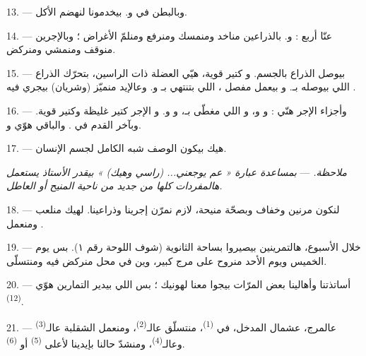 13. --- وبالبطن في  و. بيخدمونا لنهضم
الأكل.

\VUsaut{4.4mm}
\VUsaut{3.0mm}

14. --- عنّا أربع  :  و.
بالذراعين مناخد ومنمسك ومنرفع ومنلمّ الأغراض ؛ وبالإجرين منوقف ومنمشي
ومنركض.

15. ---  بيوصل الذراع بالجسم. و كتير قوية،
هيّي العضلة ذات الراسين، بتحرّك الذراع اللي  بيوصله
بـ. و بيعمل مفصل ، اللي
بتنتهي بـ و. وعالإيد منميّز
 (وشريان) بيجري فيه .

16. --- وأجزاء الإجر هنّي :  و
و، و اللي  مغطّى
بـ، و و. و
الإجر كتير غليظة وكتير قوية. وبآخر القدم في .
والباقي هوّي  و.

17. --- هيك بيكون الوصف شبه الكامل لجسم الإنسان.

\textit{ملاحظة.} --- \textit{بمساعدة عبارة « عم يوجعني... (راسي وهيك) »
بيقدر الأستاذ يستعمل هالمفردات كلها من جديد من ناحية}  \textit{المنيح أو العاطل.}

\VUsaut{5.0mm}
\VUsaut{2.4mm}
\VUsaut{3.0mm}

18. --- لنكون مرنين وخفاف وبصحّة منيحة، لازم نمرّن إجرينا وذراعينا.
لهيك منلعب ومنعمل .

19. --- خلال الأسبوع، هالتمرينين بيصيروا بساحة الثانوية (شوف اللوحة رقم
١). بس يوم الخميس ويوم الأحد منروح على مرج كبير، وين في محل منركض فيه
ومنتسلّى.

20. --- أساتذتنا وأهالينا بعض المرّات بيجوا معنا لهونيك ؛ بس اللي
بيدير التمارين هوّي \textsuperscript{(12)}.

21. --- عالمرج، عشمال المدخل، في \textsuperscript{(1)}، منتسلّق عالـ\textsuperscript{(2)}،
ومنعمل الشقلبة عالـ\textsuperscript{(3)}
وعالـ\textsuperscript{(4)}، ومنشدّ حالنا بإيدينا لأعلى
\textsuperscript{(5)} أو \textsuperscript{(6)}.

